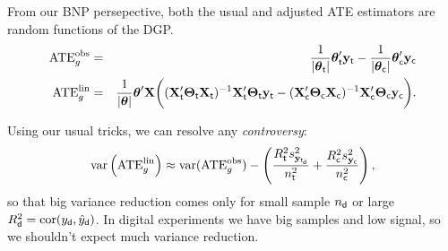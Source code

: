 \documentclass[11pt,xcolor=svgnames]{beamer}
\newcommand{\theme}{\color{Maroon}}
\newcommand{\gr}{\color{black!50}}
\newcommand{\bs}[1]{\boldsymbol{#1}}
\newcommand{\mr}[1]{\mathrm{#1}}
\newcommand{\bm}[1]{\mathbf{#1}}
\newcommand{\ds}[1]{\mathds{#1}}
\begin{document}

\begin{frame}

From our BNP persepective, both the usual and adjusted ATE estimators are random functions of the DGP.
\begin{eqnarray*}
\text{ATE}^\text{obs}_g &=& 
\frac{1}{|\bs{\theta}_{\sf t}|}\bs{\theta}_{\sf t}'\bm{y}_{\sf t} - \frac{1}{|\bs{\theta}_{\sf c}|}\bs{\theta}_{\sf c}'\bm{y}_{\sf c}
\\
\text{ATE}^\text{lin}_g &=& \frac{1}{|\bs{\theta}|}\bs{\theta}'\bm{X}\bigg( (\bm{X}_{\sf t}'\bs{\Theta}_{\sf t}\bm{X}_{\sf t})^{-1}  \bm{X}_{\sf t}'\bs{\Theta}_{\sf t}\bm{y}_{\sf t} - (\bm{X}_{\sf c}'\bs{\Theta}_{\sf c}\bm{X}_{\sf c})^{-1}  \bm{X}_{\sf c}'\bs{\Theta}_{\sf c}\bm{y}_{\sf c}\bigg).
\end{eqnarray*}

Using our usual tricks, we can resolve any \textit{controversy}:
\[
\mr{var}\left(\text{ATE}^\text{lin}_g\right) \approx \mr{var}(\text{ATE}^\text{obs}_g) - \left( \frac{R^2_{\sf t}s^2_{\bm{y}_{\sf t_{\sf d}}}}{n^2_{\sf t}} +  
\frac{R^2_{\sf c}s^2_{\bm{y}_{\sf c}}}{n^2_{\sf c}} \right),
\]
so that big variance reduction comes only for small sample $n_{\sf d}$ or large $R_{\sf d}^2 = \mr{cor}(y_{\sf d},\hat y_{\sf d})$.  {\theme In digital experiments we have big samples and low signal, so we shouldn't expect much variance reduction.}

\end{frame}
\end{document}

